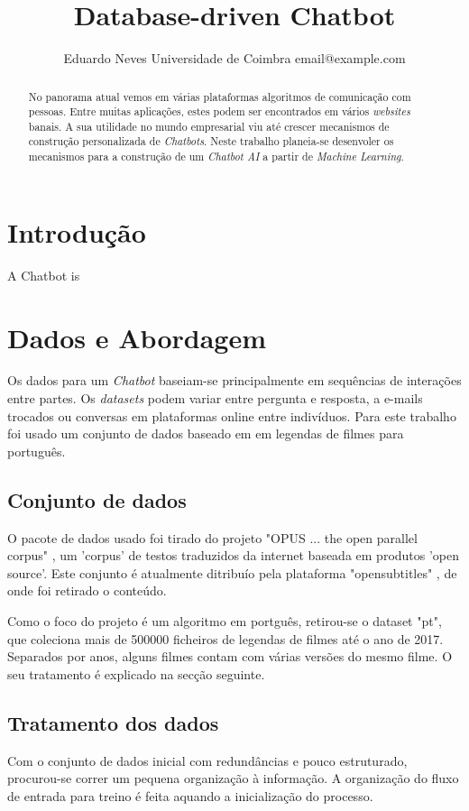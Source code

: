 \documentclass{article}
\title{Database-driven Chatbot}
\author{
    Eduardo Neves
    \affiliations
    Universidade de Coimbra
    \emails
    email@example.com
}
\begin{document}
\maketitle

\begin{abstract}
    No panorama atual vemos em várias plataformas algoritmos de comunicação com pessoas. Entre muitas aplicações, estes podem ser encontrados em vários \textit{websites} banais. A sua utilidade no mundo empresarial viu até crescer mecanismos de construção personalizada de \textit{Chatbots}. Neste trabalho planeia-se desenvoler os mecanismos para a construção de um \textit{Chatbot AI} a partir de \textit{Machine Learning}.
\end{abstract}

\section{Introdução}
A Chatbot is 


\section{Dados e Abordagem}
Os dados para um \textit{Chatbot} baseiam-se principalmente em sequências de interações entre partes. Os \textit{datasets} podem variar entre pergunta e resposta, a e-mails trocados ou conversas em plataformas online entre indivíduos. Para este trabalho foi usado um conjunto de dados baseado em em legendas de filmes para português.

\subsection{Conjunto de dados}
O pacote de dados usado foi tirado do projeto "OPUS ... the open parallel corpus" \cite{opus}, um 'corpus' de testos traduzidos da internet baseada em produtos 'open source'. Este conjunto é atualmente ditribuío pela plataforma "opensubtitles" \cite{opensubtitles}, de onde foi retirado o conteúdo.

Como o foco do projeto é um algoritmo em portguês, retirou-se o dataset "pt", que coleciona mais de 500000 ficheiros de legendas de filmes até o ano de 2017. Separados por anos, alguns filmes contam com várias versões do mesmo filme. O seu tratamento é explicado na secção seguinte. 

\subsection{Tratamento dos dados}
Com o conjunto de dados inicial com redundâncias e pouco estruturado, procurou-se correr um pequena organização à informação. A organização do fluxo de entrada para treino é feita aquando a inicialização do processo.
\end{document}
